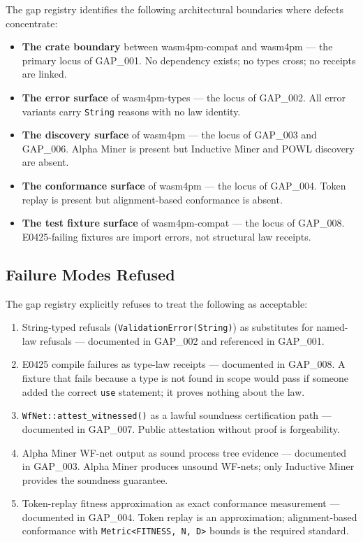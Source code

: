 The gap registry identifies the following architectural boundaries where defects
concentrate:

\begin{itemize}
  \item \textbf{The crate boundary} between wasm4pm-compat and wasm4pm — the primary
        locus of GAP\_001. No dependency exists; no types cross; no receipts are linked.
  \item \textbf{The error surface} of wasm4pm-types — the locus of GAP\_002. All error
        variants carry \texttt{String} reasons with no law identity.
  \item \textbf{The discovery surface} of wasm4pm — the locus of GAP\_003 and GAP\_006.
        Alpha Miner is present but Inductive Miner and POWL discovery are absent.
  \item \textbf{The conformance surface} of wasm4pm — the locus of GAP\_004. Token
        replay is present but alignment-based conformance is absent.
  \item \textbf{The test fixture surface} of wasm4pm-compat — the locus of GAP\_008.
        E0425-failing fixtures are import errors, not structural law receipts.
\end{itemize}

\subsection{Failure Modes Refused}
\label{sec:gaps-architecture-failures}

The gap registry explicitly refuses to treat the following as acceptable:

\begin{enumerate}
  \item String-typed refusals (\texttt{ValidationError(String)}) as substitutes for
        named-law refusals — documented in GAP\_002 and referenced in GAP\_001.
  \item E0425 compile failures as type-law receipts — documented in GAP\_008. A fixture
        that fails because a type is not found in scope would pass if someone added the
        correct \texttt{use} statement; it proves nothing about the law.
  \item \texttt{WfNet::attest\_witnessed()} as a lawful soundness certification path —
        documented in GAP\_007. Public attestation without proof is forgeability.
  \item Alpha Miner WF-net output as sound process tree evidence — documented in GAP\_003.
        Alpha Miner produces unsound WF-nets; only Inductive Miner provides the soundness
        guarantee.
  \item Token-replay fitness approximation as exact conformance measurement — documented
        in GAP\_004. Token replay is an approximation; alignment-based conformance with
        \texttt{Metric<FITNESS, N, D>} bounds is the required standard.
\end{enumerate}
